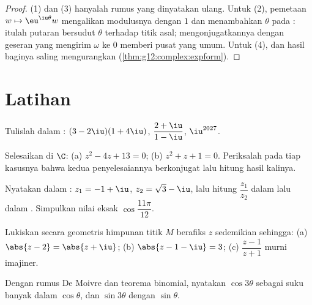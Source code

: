 \begin{proof}
(1) dan (3) hanyalah rumus  yang dinyatakan ulang. Untuk (2), pemetaan
$w \mapsto \eu^{\iu\theta} w$ mengalikan modulusnya dengan $1$ dan menambahkan
$\theta$ pada : itulah putaran bersudut $\theta$ terhadap titik asal;
mengonjugatkannya dengan geseran yang mengirim $\omega$ ke $0$ memberi pusat yang
umum. Untuk (4),  dan  hasil baginya saling mengurangkan
(\cref{thm:g12:complex:expform}).
\end{proof}

\section{Latihan}

\begin{exercise}[$\star$]\label{exo:g12:complex:1}
Tulislah dalam :
$(3 - 2\iu)(1 + 4\iu)$, \quad $\dfrac{2 + \iu}{1 - \iu}$, \quad
$\iu^{2027}$.
\end{exercise}

\begin{exercise}[$\star$]\label{exo:g12:complex:2}
Selesaikan di $\C$: (a) $z^2 - 4z + 13 = 0$; (b) $z^2 + z + 1 = 0$. Periksalah
pada tiap kasusnya bahwa kedua penyelesaiannya berkonjugat lalu hitung hasil kalinya.
\end{exercise}

\begin{exercise}[$\star$]\label{exo:g12:complex:3}
Nyatakan dalam : $z_1 = -1 + \iu$, $z_2 = \sqrt3 - \iu$, lalu hitung
$\dfrac{z_1}{z_2}$ dalam  lalu dalam . Simpulkan nilai
eksak $\cos\dfrac{11\pi}{12}$.
\end{exercise}

\begin{exercise}[$\star\star$]\label{exo:g12:complex:4}
Lukiskan secara geometris himpunan titik $M$ berafiks $z$ sedemikian sehingga:
(a) $\abs{z - 2} = \abs{z + \iu}$;\quad
(b) $\abs{z - 1 - \iu} = 3$;\quad
(c) $\dfrac{z - 1}{z + 1}$ murni imajiner.
\end{exercise}

\begin{exercise}[$\star\star$]\label{exo:g12:complex:5}
Dengan rumus De Moivre dan teorema binomial, nyatakan $\cos 3\theta$
sebagai suku banyak dalam $\cos\theta$, dan $\sin 3\theta$ dengan
$\sin\theta$.
\end{exercise}


